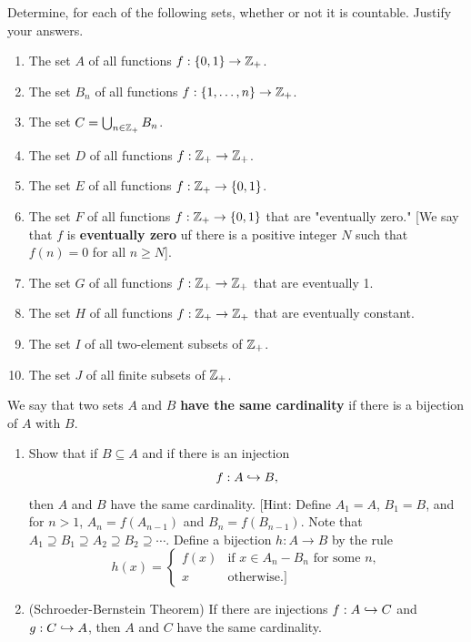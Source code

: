 \documentclass[12pt]{article}
\begin{document}
	 Determine, for each of the following sets, whether or 
	not it is countable. Justify your answers.
	\begin{enumerate}[label=(\alph*)]
		\item The set $A$ of all functions $f: \{0, 1\} \to \mathbb{Z}_{+}$.
		\item The set $B_n$ of all functions $f: \{1, \ldots, n\} \to \mathbb{Z}_{+}$.
		\item The set $C = \bigcup_{n \in \mathbb{Z}_{+}} B_n$.
		\item The set $D$ of all functions $f: \mathbb{Z}_{+} \to \mathbb{Z}_{+}$.
		\item The set $E$ of all functions $f: \mathbb{Z}_{+} \to \{0, 1\}$.
		\item The set $F$ of all functions $f: \mathbb{Z}_{+} \to \{0, 1\}$ that
		are "eventually zero." [We say that $f$ is \textbf{eventually zero} 
		uf there is a positive integer $N$ such that $f(n) = 0$ for all
		$n \geq N$].
		\item The set $G$ of all functions $f: \mathbb{Z}_{+} \to \mathbb{Z}_{+}$ that 
		are eventually 1.
		\item The set $H$ of all functions $f: \mathbb{Z}_{+} \to \mathbb{Z}_{+}$ that
		are eventually constant. 
		\item The set $I$ of all two-element subsets of $\mathbb{Z}_{+}$.
		\item The set $J$ of all finite subsets of $\mathbb{Z}_{+}$. 
	\end{enumerate}

	 We say that two sets $A$ and $B$ \textbf{have the same
	cardinality} if there is a bijection of $A$ with $B$.
	\begin{enumerate}[label=(\alph*)]
		\item Show that if $B \subseteq A$ and if there is an injection
		$$
		f: A \hookrightarrow B,
		$$
		then $A$ and $B$ have the same cardinality. [Hint: Define $A_1 = A$,
		$B_1 = B$, and for $n > 1$, $A_n = f(A_{n - 1})$ and $B_n = f(B_{n - 1})$.
		Note that $A_1 \supseteq B_1 \supseteq A_2 \supseteq B_2 \supseteq \cdots$.
		Define a bijection $h: A \to B$ by the rule
		$$
		h(x) = 
		\begin{cases}
			f(x) & \text{if } x \in A_n - B_n \text{ for some } n, \\
			x & \text{otherwise.}]
		\end{cases}
		$$
		\item 
		\begin{theorem}
			(Schroeder-Bernstein Theorem) If there are injections $f: 
			A \hookrightarrow C$ and $g: C \hookrightarrow A$, then $A$ and $C$ have the 
			same cardinality.  	
		\end{theorem}
	\end{enumerate}
\end{document}
